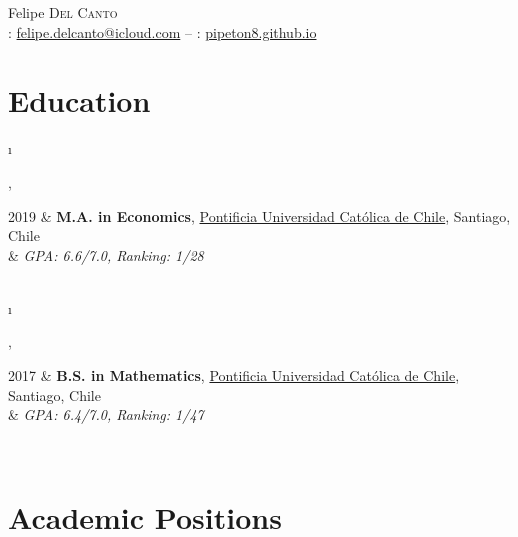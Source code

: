 \documentclass[a4paper, 10pt]{article}
\newcommand{\tablength}{}
\newcommand{\setTabParams}[1]{\renewcommand\tablength{}\forcsvlist{\listadd\tablength}{#1}}
\newcommand{\setCols}[1]{			%
	\ifnum0=\i						%
		\ifdim0cm=#1				%
			\def \firstCol {r}		%
		\else						%
			\def \firstCol {p{#1}}	%
		\fi							%
	\else \ifnum1=\i				%
		\ifdim0cm=#1				%
			\def \secondCol {l}		%
		\else						%
			\def \secondCol{p{#1}}	%
		\fi							%
	\else \ifnum2=\i				%
		\ifnum0=#1					%
			\def \sep {}			%
		\else						%
			\def \sep {|}			%
		\fi							%
	\fi \fi \fi						%
	\advance\i by1					%
}
\newcommand{\tab}[1]{							%
	\newcount\i									%
	\forlistloop{\setCols}{\tablength}			%
	\begin{tabular}{\firstCol \sep \secondCol}	%
		#1										%
	\end{tabular} \\[.5ex]						%
}
\begin{document}
\pagestyle{empty} 

\par{\centering
		{{\Huge Felipe \textsc{Del Canto}}	\\[1ex]
		{\Letter\hspace{0.1ex} : \href{mailto:felipe.delcanto@icloud.com}{felipe.delcanto@icloud.com} -- \Mundus\hspace{0.1ex} : \href{https://pipeton8.github.io}{pipeton8.github.io}}
	}\par}

%

\section{Education}
\setTabParams{0cm,0cm,0}

\tab{
\textsc{2019}
	&	\textbf{M.A. in Economics}, \href{https://economia.uc.cl/programas-academicos/magister-en-economia/}{Pontificia Universidad Católica de Chile}, Santiago, Chile											\\[0.2ex]
	&	\emph{GPA: 6.6/7.0, Ranking: 1/28}
}

\tab{
\textsc{2017}
	& 	\textbf{B.S. in Mathematics}, \href{http://www.mat.uc.cl/?lang=en}{Pontificia Universidad Católica de Chile}, Santiago, Chile	\\[0.2ex]
	&	\emph{GPA: 6.4/7.0, Ranking: 1/47}
}
\vspace{-2ex}

\section{Academic Positions}
\setTabParams{0cm,15cm,1}
\end{document}
